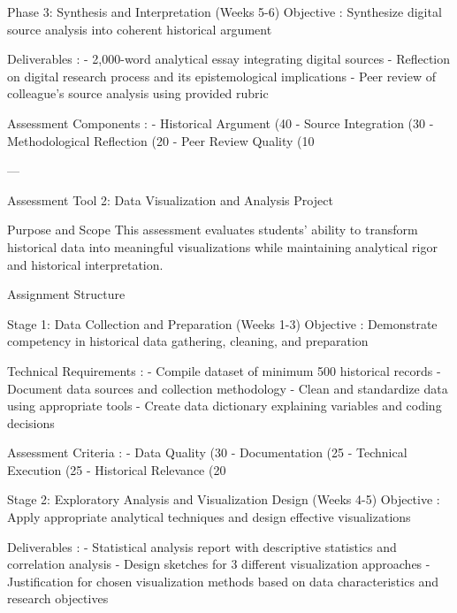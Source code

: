 \begin{appendices}
     Phase 3: Synthesis and Interpretation (Weeks 5-6)
 Objective : Synthesize digital source analysis into coherent historical argument

 Deliverables :
- 2,000-word analytical essay integrating digital sources
- Reflection on digital research process and its epistemological implications
- Peer review of colleague's source analysis using provided rubric

 Assessment Components :
-  Historical Argument  (40%
-  Source Integration  (30%
-  Methodological Reflection  (20%
-  Peer Review Quality  (10%

---

   Assessment Tool 2: Data Visualization and Analysis Project

    Purpose and Scope
This assessment evaluates students' ability to transform historical data into meaningful visualizations while maintaining analytical rigor and historical interpretation.

    Assignment Structure

     Stage 1: Data Collection and Preparation (Weeks 1-3)
 Objective : Demonstrate competency in historical data gathering, cleaning, and preparation

 Technical Requirements :
- Compile dataset of minimum 500 historical records
- Document data sources and collection methodology
- Clean and standardize data using appropriate tools
- Create data dictionary explaining variables and coding decisions

 Assessment Criteria :
-  Data Quality  (30%
-  Documentation  (25%
-  Technical Execution  (25%
-  Historical Relevance  (20%

     Stage 2: Exploratory Analysis and Visualization Design (Weeks 4-5)
 Objective : Apply appropriate analytical techniques and design effective visualizations

 Deliverables :
- Statistical analysis report with descriptive statistics and correlation analysis
- Design sketches for 3 different visualization approaches
- Justification for chosen visualization methods based on data characteristics and research objectives


\end{appendices}
